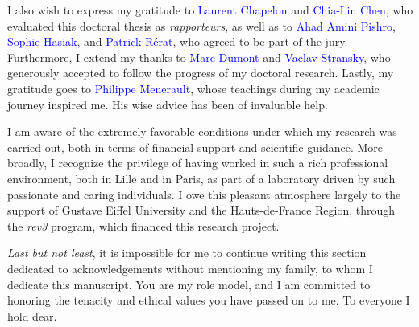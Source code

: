 I also wish to express my gratitude to \textcolor{blue}{Laurent Chapelon} and \textcolor{blue}{Chia-Lin Chen}, who evaluated this doctoral thesis as \textsl{rapporteurs}, as well as to \textcolor{blue}{Ahad Amini Pishro}, \textcolor{blue}{Sophie Hasiak}, and \textcolor{blue}{Patrick Rérat}, who agreed to be part of the jury. Furthermore, I extend my thanks to \textcolor{blue}{Marc Dumont} and \textcolor{blue}{Vaclav Stransky}, who generously accepted to follow the progress of my doctoral research. Lastly, my gratitude goes to \textcolor{blue}{Philippe Menerault}, whose teachings during my academic journey inspired me. His wise advice has been of invaluable help.%

I am aware of the extremely favorable conditions under which my research was carried out, both in terms of financial support and scientific guidance. More broadly, I recognize the privilege of having worked in such a rich professional environment, both in Lille and in Paris, as part of a laboratory driven by such passionate and caring individuals. I owe this pleasant atmosphere largely to the support of Gustave Eiffel University and the Hauts-de-France Region, through the \textsl{rev3} program, which financed this research project.%

\textsl{Last but not least}, it is impossible for me to continue writing this section dedicated to acknowledgements without mentioning my family, to whom I dedicate this manuscript. You are my role model, and I am committed to honoring the tenacity and ethical values you have passed on to me. To everyone I hold dear.%

